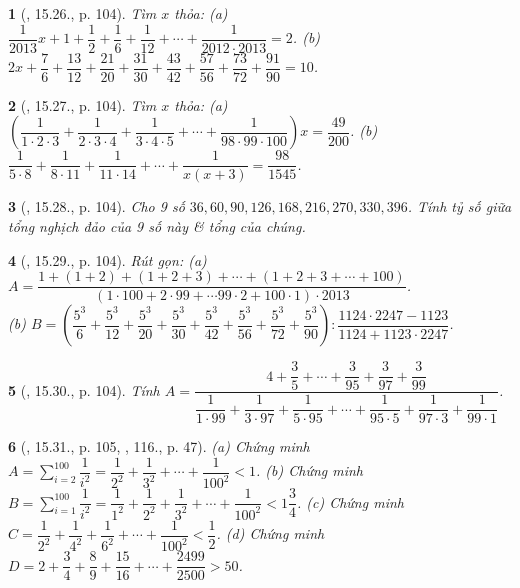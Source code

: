 \documentclass{article}
\newtheorem{baitoan}{}
\begin{document}
\begin{baitoan}[\cite{TLCT_THCS_Toan_6_so_hoc}, 15.26., p. 104]
	Tìm $x$ thỏa: (a) $\dfrac{1}{2013}x + 1 + \dfrac{1}{2} + \dfrac{1}{6} + \dfrac{1}{12} + \cdots + \dfrac{1}{2012\cdot2013} = 2$. (b) $2x + \dfrac{7}{6} + \dfrac{13}{12} + \dfrac{21}{20} + \dfrac{31}{30} + \dfrac{43}{42} + \dfrac{57}{56} + \dfrac{73}{72} + \dfrac{91}{90} = 10$.
\end{baitoan}

\begin{baitoan}[\cite{TLCT_THCS_Toan_6_so_hoc}, 15.27., p. 104]
	Tìm $x$ thỏa: (a) $\left(\dfrac{1}{1\cdot2\cdot3} + \dfrac{1}{2\cdot3\cdot4} + \dfrac{1}{3\cdot4\cdot5} + \cdots + \dfrac{1}{98\cdot99\cdot100}\right)x = \dfrac{49}{200}$. (b) $\dfrac{1}{5\cdot8} + \dfrac{1}{8\cdot11} + \dfrac{1}{11\cdot14} + \cdots + \dfrac{1}{x(x + 3)} = \dfrac{98}{1545}$.
\end{baitoan}

\begin{baitoan}[\cite{TLCT_THCS_Toan_6_so_hoc}, 15.28., p. 104]
	Cho 9 số $36,60,90,126,168,216,270,330,396$. Tính tỷ số giữa tổng nghịch đảo của 9 số này \& tổng của chúng.
\end{baitoan}

\begin{baitoan}[\cite{TLCT_THCS_Toan_6_so_hoc}, 15.29., p. 104]
	Rút gọn: (a) $A = \dfrac{1 + (1 + 2) + (1 + 2 + 3) + \cdots + (1 + 2 + 3 + \cdots + 100)}{(1\cdot100 + 2\cdot99 + \cdots 99\cdot2 + 100\cdot1)\cdot2013}$.\\(b) $B = \left(\dfrac{5^3}{6} + \dfrac{5^3}{12} + \dfrac{5^3}{20} + \dfrac{5^3}{30} + \dfrac{5^3}{42} + \dfrac{5^3}{56} + \dfrac{5^3}{72} + \dfrac{5^3}{90}\right):\dfrac{1124\cdot2247 - 1123}{1124 + 1123\cdot2247}$.
\end{baitoan}

\begin{baitoan}[\cite{TLCT_THCS_Toan_6_so_hoc}, 15.30., p. 104]
	Tính $A = \dfrac{4 + \dfrac{3}{5} + \cdots + \dfrac{3}{95} + \dfrac{3}{97} + \dfrac{3}{99}}{\dfrac{1}{1\cdot99} + \dfrac{1}{3\cdot97} + \dfrac{1}{5\cdot95} + \cdots + \dfrac{1}{95\cdot5} + \dfrac{1}{97\cdot3} + \dfrac{1}{99\cdot1}}$.
\end{baitoan}

\begin{baitoan}[\cite{TLCT_THCS_Toan_6_so_hoc}, 15.31., p. 105, \cite{Binh_Toan_6_tap_2}, 116., p. 47]
	(a) Chứng minh $A = \sum_{i=2}^{100} \dfrac{1}{i^2} = \dfrac{1}{2^2} + \dfrac{1}{3^2} + \cdots + \dfrac{1}{100^2} < 1$. (b) Chứng minh $B = \sum_{i=1}^{100} \dfrac{1}{i^2} = \dfrac{1}{1^2} + \dfrac{1}{2^2} + \dfrac{1}{3^2} + \cdots + \dfrac{1}{100^2} < 1\dfrac{3}{4}$. (c) Chứng minh $C = \dfrac{1}{2^2} + \dfrac{1}{4^2} + \dfrac{1}{6^2} + \cdots + \dfrac{1}{100^2} < \dfrac{1}{2}$. (d) Chứng minh $D = 2 + \dfrac{3}{4} + \dfrac{8}{9} + \dfrac{15}{16} + \cdots + \dfrac{2499}{2500} > 50$.
\end{baitoan}
\end{document}
